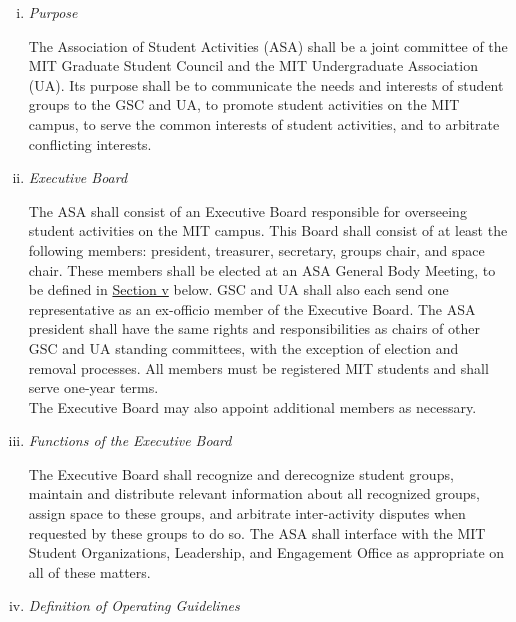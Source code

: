 \documentclass[12pt]{article}
\begin{document}
\begin{enumerate}[i.]
\item \textit{Purpose}

The Association of Student Activities (ASA) shall be a joint committee of the MIT Graduate Student Council and
    the MIT Undergraduate Association (UA).
Its purpose shall be to communicate the needs and interests of student groups to the GSC and UA, to promote
    student activities on the MIT campus, to serve the common interests of student activities, and to
    arbitrate conflicting interests.

\item \textit{Executive Board}

The ASA shall consist of an Executive Board responsible for overseeing student activities on the MIT campus.
This Board shall consist of at least the following members: president, treasurer, secretary, groups chair, and space chair.
These members shall be elected at an ASA General Body Meeting, to be defined in \hyperref[gbms]{Section v} below.
GSC and UA shall also each send one representative as an ex-officio member of the Executive Board.
The ASA president shall have the same rights and responsibilities as chairs of other GSC and UA standing committees,
    with the exception of election and removal processes.
All members must be registered MIT students and shall serve one-year terms.
\\

The Executive Board may also appoint additional members as necessary.

\item \textit{Functions of the Executive Board}

The Executive Board shall recognize and derecognize student groups, maintain and distribute relevant information
    about all recognized groups, assign space to these groups, and arbitrate inter-activity disputes when requested
    by these groups to do so.
The ASA shall interface with the MIT Student Organizations, Leadership, and Engagement Office as appropriate
    on all of these matters.

\item \textit{Definition of Operating Guidelines}
\label{gsc_bylaws:5iv}


\end{enumerate}
\end{document}
